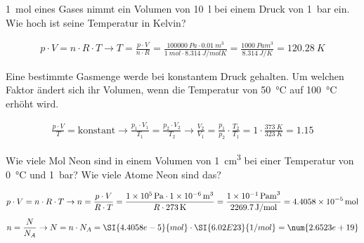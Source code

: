 \documentclass[12pt,a4paper,twoside]{article}
\begin{document}
\begin{aufgabe}
	\SI{1}{mol} eines Gases nimmt ein Volumen von \SI{10}{l} bei einem Druck von \SI{1}{bar} ein.
	Wie hoch ist seine Temperatur in Kelvin?
	\begin{loesung}
		\begin{eqnarray*}
			p\cdot V=n\cdot R\cdot T \to T=\frac{p\cdot V}{n\cdot R}=\frac{\SI{100000}{Pa}\cdot\SI{0.01}{m^3}}{\SI{1}{mol}\cdot\SI{8.314}{J/mol K}}=\frac{\SI{1000}{Pa m^3}}{\SI{8.314}{J/ K}}=\SI{120.28}{K}
		\end{eqnarray*}
	\end{loesung}
\end{aufgabe}

\begin{aufgabe}
	Eine bestimmte Gasmenge werde bei konstantem Druck gehalten. Um welchen Faktor ändert sich
	ihr Volumen, wenn die Temperatur von \SI{50}{\celsius} auf \SI{100}{\celsius} erhöht wird.
	\begin{loesung}
		\begin{eqnarray*}
			\frac{p\cdot V}{T}=\text{konstant}\to\frac{p_1\cdot V_1}{T_1}=\frac{p_2\cdot V_2}{T_2}\to\frac{V_2}{V_1}=\frac{p_1}{p_2}\cdot\frac{T_2}{T_1}=1\cdot\frac{\SI{373}{K}}{\SI{323}{K}}=\num{1.15}
		\end{eqnarray*}
	\end{loesung}

\end{aufgabe}

\begin{aufgabe}
	Wie viele Mol Neon sind in einem Volumen von \SI{1}{cm^3} bei einer Temperatur von \SI{0}{\celsius} und \SI{1}{bar}?
	Wie viele Atome Neon sind das?
	\begin{loesung}
		\begin{eqnarray*}
			p\cdot V=n\cdot R\cdot T \to n=\frac{p\cdot V}{R\cdot T}=\frac{\SI{1E5}{Pa}\cdot\SI{1E-6}{m^3}}{R\cdot\SI{273}{K}}=\frac{\SI{1E-1}{Pa m^3}}{\SI{2269.7}{J/mol}}=\SI{4.4058e-5}{mol}
		\end{eqnarray*}
		\begin{eqnarray*}
			n=\frac{N}{N_A}\to N=n\cdot N_A=\SI{4.4058e-5}{mol}\cdot\SI{6.02E23}{1/mol}=\num{2.6523e+19}
		\end{eqnarray*}
	\end{loesung}
\end{aufgabe}



%



\newpage
{}
\end{document}
